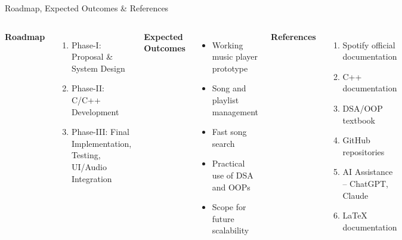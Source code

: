 \documentclass[aspectratio=169,11pt]{beamer}
\begin{document}
\begin{frame}{Roadmap, Expected Outcomes \& References}

\setlength{\parskip}{0pt}
\setlength{\itemsep}{0pt}

\begin{columns}[T,totalwidth=\textwidth]


{\small
\textbf{\color{GEUBlue}Roadmap}

\vspace{1mm}
\begin{enumerate}
    \setlength{\itemsep}{2pt}
    \setlength{\parskip}{0pt}
    \item Phase-I: Proposal \& System Design
    \item Phase-II: C/C++ Development
    \item Phase-III: Final Implementation, Testing,
          UI/Audio Integration
\end{enumerate}

\vspace{2mm}
\textbf{\color{GEUBlue}Expected Outcomes}

\vspace{1mm}
\begin{itemize}
    \setlength{\itemsep}{2pt}
    \setlength{\parskip}{0pt}
    \item Working music player prototype
    \item Song and playlist management
    \item Fast song search
    \item Practical use of DSA and OOPs
    \item Scope for future scalability
\end{itemize}
}


{\small
\textbf{\color{GEUBlue}References}

\vspace{1mm}
\begin{enumerate}
    \setlength{\itemsep}{3pt}
    \setlength{\parskip}{0pt}
    \item Spotify official documentation
    \item C++ documentation
    \item DSA/OOP textbook
    \item GitHub repositories
    \item AI Assistance -- ChatGPT, Claude
    \item LaTeX documentation
\end{enumerate}
}


\end{columns}
\end{frame}
\end{document}
